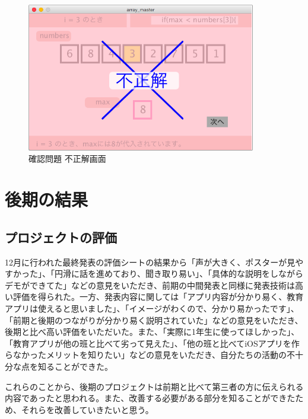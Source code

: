\documentclass[openany,11pt,papersize]{jsbook}
\begin{document}
\begin{figure}[H]
\begin{center}
\includegraphics[width=10cm, bb=0 0 644 419]{img/10thParagraph/kakuninmondai_06.png}
\end{center}
\caption{確認問題 不正解画面}
\end{figure}



\chapter{後期の結果}

\section{プロジェクトの評価}
\par 12月に行われた最終発表の評価シートの結果から「声が大きく、ポスターが見やすかった」、「円滑に話を進めており、聞き取り易い」、「具体的な説明をしながらデモができてた」などの意見をいただき、前期の中間発表と同様に発表技術は高い評価を得られた。一方、発表内容に関しては「アプリ内容が分かり易く、教育アプリは使えると思いました」、「イメージがわくので、分かり易かったです」、「前期と後期のつながりが分かり易く説明されていた」などの意見をいただき、後期と比べ高い評価をいただいた。また、「実際に1年生に使ってほしかった」、「教育アプリが他の班と比べて劣って見えた」、「他の班と比べてiOSアプリを作らなかったメリットを知りたい」などの意見をいただき、自分たちの活動の不十分な点を知ることができた。
\par これらのことから、後期のプロジェクトは前期と比べて第三者の方に伝えられる内容であったと思われる。また、改善する必要がある部分を知ることができたため、それらを改善していきたいと思う。
\end{document}
